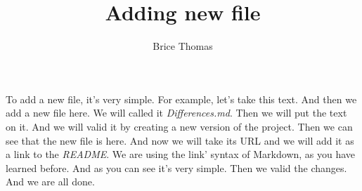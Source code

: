 \documentclass{article}
\title{Adding new file}
\author{Brice Thomas}
\date{}
\begin{document}
\maketitle

To add a new file, it's very simple. For example, let's take this text. And then we add a new file here. We will called it \emph{Differences.md}. Then we will put the text on it. And we will valid it by creating a new version of the project. Then we can see that the new file is here. And now we will take its URL and we will add it as a link to the \emph{README}. We are using the link' syntax of Markdown, as you have learned before. And as you can see it's very simple. Then we valid the changes. And we are all done.
\end{document}
